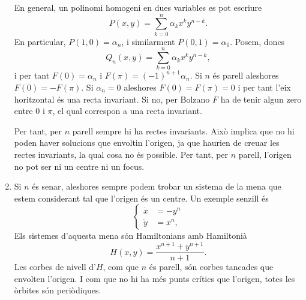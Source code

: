 \documentclass[12pt]{article}
\begin{document}
\begin{enumerate}[label=(\roman*), font=\bfseries \sffamily, wide, labelwidth=!, labelindent=0pt]
		En general, un polinomi homogeni en dues variables es pot escriure
		\begin{equation*}
			P(x,y) = \sum_{k = 0}^n \alpha_k x^k y^{n - k}.
		\end{equation*}
		En particular, \( P(1, 0) = \alpha_n \), i similarment \( P(0,1) = \alpha_0 \). Posem, doncs
		\begin{equation*}
			Q_n(x,y) = \sum_{k = 0}^n \alpha_k x^k y^{n - k},
		\end{equation*}
		i per tant \( F(0) = \alpha_n \) i \( F(\pi) = (-1)^{n+1} \alpha_n \). Si \( n \) és parell aleshores \( F(0) = - F(\pi) \). Si \( \alpha_n = 0 \) aleshores \( F(0) = F(\pi) = 0 \) i per tant l'eix horitzontal és una recta invariant. Si no, per Bolzano \( F \) ha de tenir algun zero entre \( 0 \) i \( \pi \), el qual correspon a una recta invariant. 

		Per tant, per \( n \) parell sempre hi ha rectes invariants. Això implica que no hi poden haver solucions que envoltin l'origen, ja que haurien de creuar les rectes invariants, la qual cosa no és possible. Per tant, per \( n \) parell, l'origen no pot ser ni un centre ni un focus.  

	\item Si \( n \) és senar, aleshores sempre podem trobar un sistema de la mena que estem considerant tal que l'origen és un centre. Un exemple senzill és 
		\begin{equation*}
			\left\{ 
				\begin{aligned}
					\dot{x} & = -y^n \\
					\dot{y} & = x^n,
				\end{aligned} 
			\right. 
		\end{equation*}
		Els sistemes d'aquesta mena són Hamiltonians amb Hamiltonià
		\begin{equation*}
			H(x,y) = \frac{x^{n+1} + y^{n+1}}{n + 1}. 
		\end{equation*}
		Les corbes de nivell d'\( H \), com que \( n \) és parell, són corbes tancades que envolten l'origen. I com que no hi ha més punts crítics que l'origen, totes les òrbites són periòdiques. 


\end{enumerate}
\end{document}
